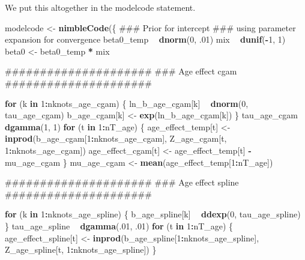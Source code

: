 \documentclass[11pt,]{article}
\newenvironment{Shaded}{\begin{snugshade}}{\end{snugshade}}
\newcommand{\KeywordTok}[1]{\textcolor[rgb]{0.13,0.29,0.53}{\textbf{#1}}}
\newcommand{\DecValTok}[1]{\textcolor[rgb]{0.00,0.00,0.81}{#1}}
\newcommand{\StringTok}[1]{\textcolor[rgb]{0.31,0.60,0.02}{#1}}
\newcommand{\ControlFlowTok}[1]{\textcolor[rgb]{0.13,0.29,0.53}{\textbf{#1}}}
\newcommand{\OperatorTok}[1]{\textcolor[rgb]{0.81,0.36,0.00}{\textbf{#1}}}
\newcommand{\NormalTok}[1]{#1}
\begin{document}
We put this altogether in the modelcode statement.

\begin{Shaded}
\begin{Highlighting}[]
\NormalTok{modelcode <-}\StringTok{ }\KeywordTok{nimbleCode}\NormalTok{(\{}
\NormalTok{  ### Prior for intercept}
\NormalTok{  ### using parameter expansion for convergence}
\NormalTok{  beta0_temp }\OperatorTok{~}\StringTok{ }\KeywordTok{dnorm}\NormalTok{(}\DecValTok{0}\NormalTok{, .}\DecValTok{01}\NormalTok{)}
\NormalTok{  mix }\OperatorTok{~}\StringTok{ }\KeywordTok{dunif}\NormalTok{(}\OperatorTok{-}\DecValTok{1}\NormalTok{, }\DecValTok{1}\NormalTok{)}
\NormalTok{  beta0 <-}\StringTok{ }\NormalTok{beta0_temp }\OperatorTok{*}\StringTok{ }\NormalTok{mix}

\NormalTok{  #####################}
\NormalTok{  ### Age effect cgam}
\NormalTok{  #####################}

  \ControlFlowTok{for}\NormalTok{ (k }\ControlFlowTok{in} \DecValTok{1}\OperatorTok{:}\NormalTok{nknots_age_cgam) \{}
\NormalTok{    ln_b_age_cgam[k] }\OperatorTok{~}\StringTok{ }\KeywordTok{dnorm}\NormalTok{(}\DecValTok{0}\NormalTok{, tau_age_cgam)}
\NormalTok{    b_age_cgam[k] <-}\StringTok{ }\KeywordTok{exp}\NormalTok{(ln_b_age_cgam[k])}
\NormalTok{  \}}
\NormalTok{  tau_age_cgam }\OperatorTok{~}\StringTok{ }\KeywordTok{dgamma}\NormalTok{(}\DecValTok{1}\NormalTok{, }\DecValTok{1}\NormalTok{)}
  \ControlFlowTok{for}\NormalTok{ (t }\ControlFlowTok{in} \DecValTok{1}\OperatorTok{:}\NormalTok{nT_age) \{}
\NormalTok{    age_effect_temp[t] <-}\StringTok{ }\KeywordTok{inprod}\NormalTok{(b_age_cgam[}\DecValTok{1}\OperatorTok{:}\NormalTok{nknots_age_cgam],}
\NormalTok{                                 Z_age_cgam[t, }\DecValTok{1}\OperatorTok{:}\NormalTok{nknots_age_cgam])}
\NormalTok{    age_effect_cgam[t] <-}\StringTok{ }\NormalTok{age_effect_temp[t] }\OperatorTok{-}\StringTok{ }\NormalTok{mu_age_cgam}
\NormalTok{  \}}
\NormalTok{  mu_age_cgam <-}\StringTok{ }\KeywordTok{mean}\NormalTok{(age_effect_temp[}\DecValTok{1}\OperatorTok{:}\NormalTok{nT_age])}

\NormalTok{  #####################}
\NormalTok{  ### Age effect spline}
\NormalTok{  #####################}

  \ControlFlowTok{for}\NormalTok{ (k }\ControlFlowTok{in} \DecValTok{1}\OperatorTok{:}\NormalTok{nknots_age_spline) \{}
\NormalTok{    b_age_spline[k] }\OperatorTok{~}\StringTok{ }\KeywordTok{ddexp}\NormalTok{(}\DecValTok{0}\NormalTok{, tau_age_spline)}
\NormalTok{  \}}
\NormalTok{  tau_age_spline }\OperatorTok{~}\StringTok{ }\KeywordTok{dgamma}\NormalTok{(.}\DecValTok{01}\NormalTok{, .}\DecValTok{01}\NormalTok{)}
  \ControlFlowTok{for}\NormalTok{ (t }\ControlFlowTok{in} \DecValTok{1}\OperatorTok{:}\NormalTok{nT_age) \{}
\NormalTok{    age_effect_spline[t] <-}\StringTok{ }\KeywordTok{inprod}\NormalTok{(b_age_spline[}\DecValTok{1}\OperatorTok{:}\NormalTok{nknots_age_spline],}
\NormalTok{                                   Z_age_spline[t, }\DecValTok{1}\OperatorTok{:}\NormalTok{nknots_age_spline])}
\NormalTok{  \}}


\end{Highlighting}
\end{Shaded}
\end{document}
